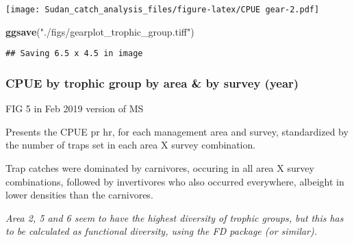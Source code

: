 \documentclass[]{article}
\newenvironment{Shaded}{\begin{snugshade}}{\end{snugshade}}
\newcommand{\KeywordTok}[1]{\textcolor[rgb]{0.13,0.29,0.53}{\textbf{#1}}}
\newcommand{\StringTok}[1]{\textcolor[rgb]{0.31,0.60,0.02}{#1}}
\newcommand{\NormalTok}[1]{#1}
\begin{document}
\texttt{[image: Sudan\_catch\_analysis\_files/figure-latex/CPUE gear-2.pdf]}

\begin{Shaded}
\begin{Highlighting}[]
\KeywordTok{ggsave}\NormalTok{(}\StringTok{"./figs/gearplot_trophic_group.tiff"}\NormalTok{)}
\end{Highlighting}
\end{Shaded}

\begin{verbatim}
## Saving 6.5 x 4.5 in image
\end{verbatim}

\subsubsection{CPUE by trophic group by area \& by survey
(year)}\label{cpue-by-trophic-group-by-area-by-survey-year}

FIG 5 in Feb 2019 version of MS

Presents the CPUE pr hr, for each management area and survey,
standardized by the number of traps set in each area X survey
combination.

Trap catches were dominated by carnivores, occuring in all area X survey
combinations, followed by invertivores who also occurred everywhere,
albeight in lower densities than the carnivores.

\emph{Area 2, 5 and 6 seem to have the highest diversity of trophic
groups, but this has to be calculated as functional diversity, using the
FD package (or similar). }
\end{document}

